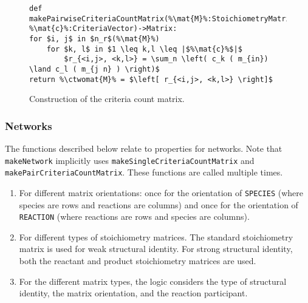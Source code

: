 \documentclass{article}
\newcommand{\mat}[1]{${\bf #1}$} %
\newcommand{\ctwomat}[1]{${\bf #1}^{{\bf c}^2}$} %
\begin{document}
\begin{figure}
\begin{lstlisting}[mathescape=true,escapechar=\%]
def makePairwiseCriteriaCountMatrix(%\mat{M}%:StoichiometryMatrix, %\mat{c}%:CriteriaVector)->Matrix:
for $i, j$ in $n_r$(%\mat{M}%)
    for $k, l$ in $1 \leq k,l \leq |$%\mat{c}%$|$
        $r_{<i,j>, <k,l>} = \sum_n \left( c_k ( m_{in}) \land c_l ( m_{j n} ) \right)$
return %\ctwomat{M}% = $\left[ r_{<i,j>, <k,l>} \right]$             
\end{lstlisting}
\caption{Construction of the criteria count matrix.}\label{alg:makePairwiseCriteriaCountMatrix}
\end{figure}

\subsubsection{Networks}
The functions described below relate to properties for networks. Note that {\tt makeNetwork} implicitly uses {\tt makeSingleCriteriaCountMatrix} and {\tt makePairCriteriaCountMatrix}. These functions are called multiple times.
\begin{enumerate}
    \item For different matrix orientations: once for the orientation of {\tt SPECIES} (where species are rows and reactions are columns) and once for the orientation of {\tt REACTION} (where reactions are rows and species are columns).
    \item For different types of stoichiometry matrices. The standard stoichiometry matrix is used for weak structural identity. For strong structural identity, both the reactant and product stoichiometry matrices are used.
    \item For the different matrix types, the logic considers the type of structural identity, the matrix orientation, and the reaction participant.
\end{enumerate}
\end{document}

